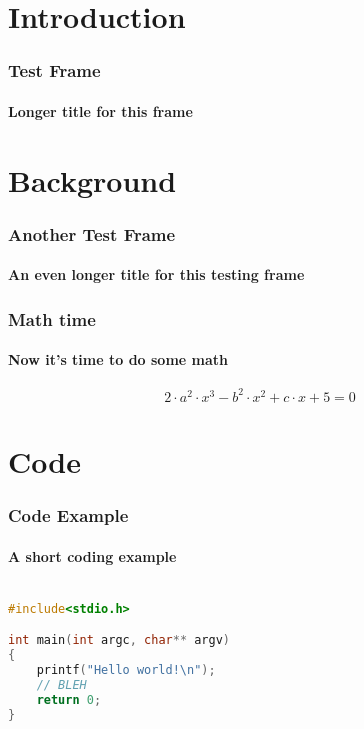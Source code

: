 



\section{Introduction}

\begin{frame}[label=TESTFRAME]
\frametitle{Test Frame}
\framesubtitle{Longer title for this frame}

\lipsum[4]

\end{frame}



\section{Background}

\begin{frame}[label=TESTFRAME2]
\frametitle{Another Test Frame}
\framesubtitle{An even longer title for this testing frame}

\lipsum[4]

\end{frame}


\begin{frame}[label=MATHFRAME]
\frametitle{Math time}
\framesubtitle{Now it's time to do some math}

\lipsum[2]

\begin{equation}
2 \cdot a^{2} \cdot x^{3} - b^{2} \cdot x^{2} + c \cdot x + 5 = 0
\end{equation}


\end{frame}




\section{Code}

\begin{frame}[fragile,label=CODEFRAME]
\frametitle{Code Example}
\framesubtitle{A short coding example}

\begin{lstlisting}[language=C,basicstyle=\ttfamily]

#include<stdio.h>

int main(int argc, char** argv)
{
    printf("Hello world!\n");
    // BLEH
    return 0;
}

\end{lstlisting}

\end{frame}



